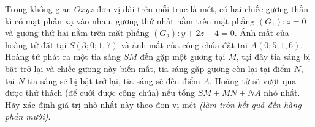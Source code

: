 \begin{ex}%
	Trong không gian $Oxyz$ đơn vị dài trên mỗi trục là mét, có hai chiếc gương thần kì có mặt phản xạ vào nhau, gương thứ nhất nằm trên mặt phẳng $(G_1) \colon z = 0$ và gương thứ hai nằm trên mặt phẳng $(G_2) \colon y + 2z - 4 = 0$. Ánh mắt của hoàng tử đặt tại $S(3; 0; 1{,}7)$ và ánh mắt của công chúa đặt tại $A(0; 5; 1{,}6)$. Hoàng tử phát ra một tia sáng $SM$ đến gặp một gương tại $M$, tại đây tia sáng bị bật trở lại và chiếc gương này biến mất, tia sáng gặp gương còn lại tại điểm $N$, tại $N$ tia sáng sẽ bị bật trở lại, tia sáng sẽ đến điểm $A$. Hoàng tử sẽ vượt qua được thử thách (để cưới được công chúa) nếu tổng $SM + MN + NA$ nhỏ nhất. Hãy xác định giá trị nhỏ nhất này theo đơn vị mét \textit{(làm tròn kết quả đến hàng phần mười)}.
	\par
	\loigiai{
}
\end{ex}
